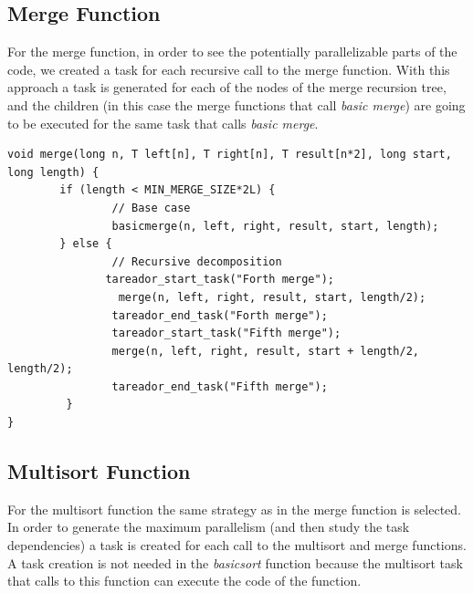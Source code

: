\documentclass[12]{article}
\begin{document}
\subsection{Merge Function}
For the merge function, in order to see the potentially parallelizable parts of the code, we created a task for each recursive call to the merge function. With this approach a task is generated for each of the nodes of the merge recursion tree, and the children (in this case the merge functions that call \textit{basic merge}) are going to be executed for the same task that calls \textit{basic merge}. 
\\
\medskip
\begin{lstlisting}[frame=single]
void merge(long n, T left[n], T right[n], T result[n*2], long start, long length) {
        if (length < MIN_MERGE_SIZE*2L) {
                // Base case
                basicmerge(n, left, right, result, start, length);
        } else {
                // Recursive decomposition
               tareador_start_task("Forth merge");
                 merge(n, left, right, result, start, length/2);
                tareador_end_task("Forth merge");
                tareador_start_task("Fifth merge");
                merge(n, left, right, result, start + length/2, length/2);
                tareador_end_task("Fifth merge");
         }
}
\end{lstlisting}
\subsection{Multisort Function}
For the multisort function the same strategy as in the merge function is selected. In order to generate the maximum parallelism (and then study the task dependencies) a task is created for each call to the multisort and merge functions. A task creation is not needed in the \textit{basicsort} function because the multisort task that calls to this function can execute the code of the function. 
\\
\medskip
\end{document}
